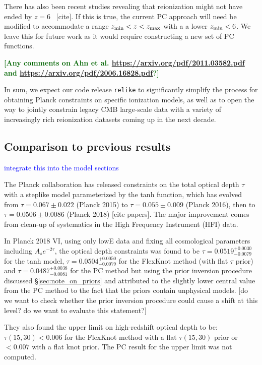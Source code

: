 \documentclass[prd,twocolumn,amsmath,amssymb,floatfix,superscriptaddress,nofootinbib]{revtex4-1}
\newcommand{\wh}[1]{\textcolor{blue}{#1}}
\newcommand{\todo}[1]{\textcolor{darkgreen}{\bf{#1}}}
\begin{document}
{There has also been recent studies revealing that reionization might not have ended by $z = 6$~\cite{} [cite]. If this is true, the current PC approach will need be modified to accommodate a range $z_{\rm min} < z < z_{\rm max}$ with a a lower $z_{\rm min} < 6$. We leave this for future work as it would require constructing a new set of PC functions. 

\todo{[Any comments on Ahn et al. \url{https://arxiv.org/pdf/2011.03582.pdf} and \url{https://arxiv.org/pdf/2006.16828.pdf}?]
}

In sum, we expect our code release \texttt{relike} to significantly simplify the process for obtaining Planck constraints on specific ionization models, as well as to open the way to jointly constrain legacy CMB large-scale data with a variety of increasingly rich reionization datasets coming up in the next decade.



\appendix



\subsection{Comparison to previous results}
\wh{integrate this into the model sections}

The Planck collaboration has released constraints on the total optical depth $\tau$ with a steplike model parameterized by the tanh function, which has evolved from $\tau = 0.067 \pm 0.022$ (Planck 2015) to $\tau = 0.055 \pm 0.009$ (Planck 2016), then to $\tau = 0.0506 \pm 0.0086$ (Planck 2018) [cite papers]. The major improvement comes from clean-up of systematics in the High Frequency Instrument (HFI) data. 

In Planck 2018 VI, using only lowE data and fixing all cosmological parameters including $A_s e^{-2\tau}$, the optical depth constraints was found to be $\tau = 0.0519^{+0.0030}_{-0.0079}$ for the tanh model, 
$\tau = 0.0504^{+0.0050}_{-0.0079}$ 
for the FlexKnot method (with flat $\tau$ prior) and 
$\tau = 0.0487^{+0.0038}_{-0.0081}$
for the PC method but using the prior inversion procedure
discussed \S\ref{sec:note_on_priors} and attributed to the slightly lower central value from the PC method to the fact that the priors contain unphysical models. [do we want to check whether the prior inversion procedure could cause a shift at this level? do we want to evaluate this statement?]

They also found the upper limit on high-redshift optical depth to be: $\tau(15, 30) < 0.006$ for the FlexKnot method with a flat $\tau(15, 30)$ prior or $<0.007$ with a flat knot prior. The PC result for the upper limit was not computed. 

}
\end{document}
